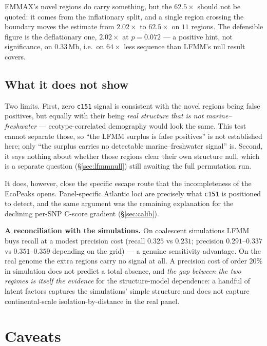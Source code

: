\documentclass[11pt,a4paper]{article}
\begin{document}
EMMAX's novel regions do carry something, but the $62.5\times$ should not be quoted: it
comes from the inflationary split, and a single region crossing the boundary moves the
estimate from $2.02\times$ to $62.5\times$ on $11$ regions. The defensible figure is the
deflationary one, $2.02\times$ at $p = 0.072$ --- a positive hint, not significance, on
$0.33$\,Mb, i.e.\ on $64\times$ less sequence than LFMM's null result covers.

\subsection{What it does not show}

Two limits. First, zero \texttt{c151} signal is consistent with the novel regions being
false positives, but equally with their being \emph{real structure that is not
marine--freshwater} --- ecotype-correlated demography would look the same. This test cannot
separate those, so ``the LFMM surplus is false positives'' is not established here; only
``the surplus carries no detectable marine--freshwater signal'' is. Second, it says nothing
about whether those regions clear their own structure null, which is a separate question
(\S\ref{sec:lfmmnull}) still awaiting the full permutation run.

It does, however, close the specific escape route that the incompleteness of the EcoPeaks
opens. Panel-specific Atlantic loci are precisely what \texttt{c151} is positioned to
detect, and the same argument was the remaining explanation for the declining per-SNP
C-score gradient (\S\ref{sec:calib}).

\textbf{A reconciliation with the simulations.} On coalescent simulations LFMM buys recall
at a modest precision cost (recall $0.325$ vs $0.231$; precision $0.291$--$0.337$ vs
$0.351$--$0.359$ depending on the grid) --- a genuine sensitivity advantage. On the real
genome the extra regions carry no signal at all. A precision cost of order $20\%$ in
simulation does not predict a total absence, and \emph{the gap between the two regimes is
itself the evidence} for the structure-model dependence: a handful of latent factors
captures the simulations' simple structure and does not capture continental-scale
isolation-by-distance in the real panel.

\section{Caveats}
\end{document}
